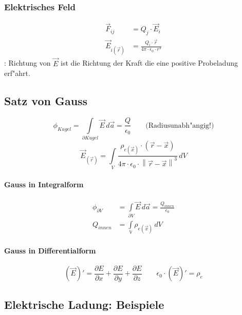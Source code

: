 \subsubsection{Elektrisches Feld}
\begin{align}
	\overrightarrow{F}_{ij} &= Q_j\cdot\overrightarrow{E}_i \\
	\overrightarrow{E}_{i(\overrightarrow{r})} &= \frac{Q_i\cdot\overrightarrow{r}}{4\pi\cdot\epsilon_0\cdot r^3}
\end{align}
 : Richtung von $\overrightarrow{E}$ ist die Richtung der Kraft die eine positive Probeladung erf"ahrt.

\subsection{Satz von Gauss}
\begin{equation}
	\phi_{Kugel}=\int\limits_{\partial Kugel}\overrightarrow{E}\,d\overrightarrow{a}=\frac{Q}{\epsilon_0}\qquad\text{(Radiusunabh"angig!)}
\end{equation}
\begin{equation}
	\overrightarrow{E}_{(\overrightarrow{r})}=\int\limits_V\frac{\rho_{e(\overrightarrow{x})}\cdot(\overrightarrow{r}-\overrightarrow{x})}{4\pi\cdot\epsilon_0\cdot\left\|{\overrightarrow{r}-\overrightarrow{x}}\right\|^3}\,dV
\end{equation}

\paragraph{Gauss in Integralform}
\begin{align}
	\phi_{\partial V} &=\int\limits_{\partial V}\overrightarrow{E}\,d\overrightarrow{a}=\frac{Q_{innen}}{\epsilon_0} \\
	Q_{innen} &= \int\limits_\mathbb{V}\rho_{e(\overrightarrow{x})}\,dV
\end{align}

\paragraph{Gauss in Differentialform}
\begin{equation}
	\left(\overrightarrow{E}\right)'=\frac{\partial E}{\partial x}+\frac{\partial E}{\partial y}+\frac{\partial E}{\partial z}\qquad\epsilon_0\cdot\left(\overrightarrow{E}\right)'=\rho_e
\end{equation}

\subsection{Elektrische Ladung: Beispiele}

